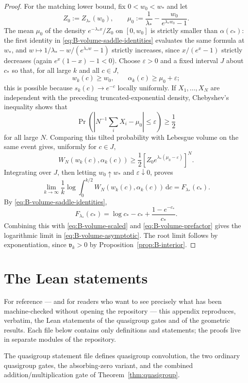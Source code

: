 \documentclass[11pt]{article}
\theoremstyle{definition}
\theoremstyle{remark}
\begin{document}
\begin{proof}
For the matching lower bound, fix $0<w_0<w_*$ and let
\[
 Z_0:=Z_{\lambda_*}(w_0),\qquad
 \mu_0:=\frac1{\lambda_*}
        -\frac{w_0}{e^{\lambda_*w_0}-1}.
\]
The mean $\mu_0$ of the density
$e^{-\lambda_*x}/Z_0$ on $[0,w_0]$ is strictly smaller than
$\alpha(c_*)$: the first identity in
\eqref{eq:B-volume-saddle-identities} evaluates the same formula at
$w_*$, and $w\mapsto1/\lambda_*-w/(e^{\lambda_*w}-1)$ strictly
increases, since $x/(e^x-1)$ strictly decreases (again
$e^x(1-x)-1<0$).  Choose
$\varepsilon>0$ and a fixed interval $J$ about $c_*$ so that, for all
large $k$ and all $c\in J$,
\[
 w_k(c)\ge w_0,\qquad \alpha_k(c)\ge\mu_0+\varepsilon;
\]
this is possible because $s_k(c)\to e^{-c}$ locally uniformly.  If
$X_1,\ldots,X_N$ are independent with the preceding truncated-exponential
density, Chebyshev's inequality shows that
\[
 \Pr\left(\left|N^{-1}\sum_iX_i-\mu_0\right|\le\varepsilon\right)
 \ge\frac12
\]
for all large $N$.  Comparing this tilted probability with Lebesgue volume
on the same event gives, uniformly for $c\in J$,
\[
 W_N(w_k(c),\alpha_k(c))
 \ge\frac12\left[Z_0e^{\lambda_*(\mu_0-\varepsilon)}\right]^N.
\]
Integrating over $J$, then letting $w_0\uparrow w_*$ and
$\varepsilon\downarrow0$, proves
\[
 \lim_{k\to\infty}\frac1k\log
 \int_0^{k/2}W_N(w_k(c),\alpha_k(c))\,\mathrm d c
 =F_{\lambda_*}(c_*).
\]
By \eqref{eq:B-volume-saddle-identities},
\[
 F_{\lambda_*}(c_*)
 =\log c_*-c_*+\frac{1-e^{-c_*}}{c_*}.
\]
Combining this with \eqref{eq:B-volume-scaled} and
\eqref{eq:B-volume-prefactor} gives the logarithmic limit in
\eqref{eq:B-volume-asymptotic}.  The root limit follows by exponentiation,
since $\mathfrak v_k>0$ by Proposition~\ref{prop:B-interior}.
\end{proof}

\section{The Lean statements}\label{app:lean-statement}

For reference --- and for readers who want to see precisely what has
been machine-checked without opening the repository --- this appendix
reproduces, verbatim, the Lean statements of the quasigroup gates and of
the geometric results.  Each file below contains only definitions and
statements; the proofs live in separate modules of the repository.

The quasigroup statement file defines quasigroup convolution, the two
ordinary quasigroup gates, the absorbing-zero variant, and the combined
addition/multiplication gate of Theorem~\ref{thm:quasigroup}.
\end{document}
